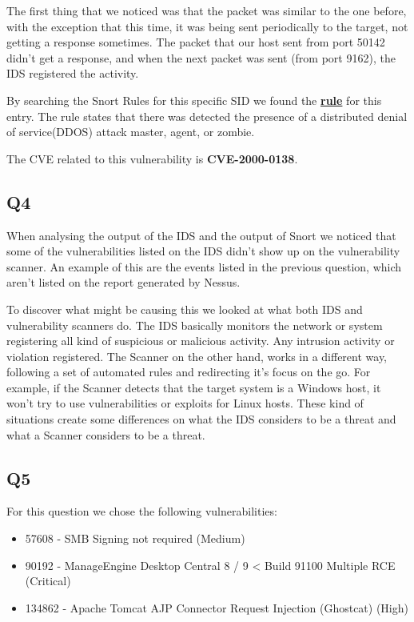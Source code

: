The first thing that we noticed was that the packet was similar to the one before, with the exception that this time, it was being sent periodically to the target, not getting a response sometimes. The packet that our host sent from port 50142 didn't get a response, and when the next packet was sent (from port 9162), the IDS registered the activity. 

By searching the Snort Rules for this specific SID we found the \textbf{\href{https://www.snort.org/rule_docs/1-249}{rule}} for this entry. The rule states that there was detected the presence of a distributed denial of service(DDOS) attack master, agent, or zombie.

The CVE related to this vulnerability is \textbf{CVE-2000-0138}. 

\subsection{Q4}

When analysing the output of the IDS and the output of Snort we noticed that some of the vulnerabilities listed on the IDS didn't show up on the vulnerability scanner. An example of this are the events listed in the previous question, which aren't listed on the report generated by Nessus. 

To discover what might be causing this we looked at what both IDS and vulnerability scanners do. The IDS basically monitors the network or system registering all kind of suspicious or malicious activity. Any intrusion activity or violation registered. The Scanner on the other hand, works in a different way, following a set of automated rules and redirecting it's focus on the go. For example, if the Scanner detects that the target system is a Windows host, it won't try to use vulnerabilities or exploits for Linux hosts. These kind of situations create some differences on what the IDS considers to be a threat and what a Scanner considers to be a threat.

\pagebreak

\subsection{Q5}

For this question we chose the following vulnerabilities:

\begin{itemize}
  \item 57608 - SMB Signing not required (Medium)
  \item 90192 - ManageEngine Desktop Central 8 / 9 < Build 91100 Multiple RCE (Critical)
  \item 134862 - Apache Tomcat AJP Connector Request Injection (Ghostcat) (High)
\end{itemize}

